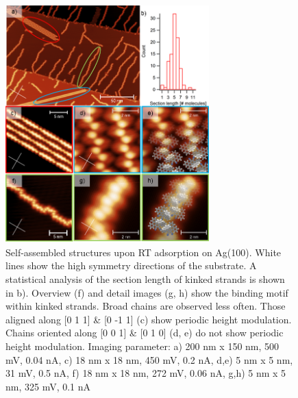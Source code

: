 \begin{figure} \centering
	\includegraphics[width=0.7\textwidth]{./images/paper/helicene/fig3}
	\caption{Self-assembled structures upon RT adsorption on Ag(100). White lines show the high symmetry directions of the substrate. A statistical analysis of the section length of kinked strands is shown in b). Overview (f) and detail images (g, h) show the binding motif within kinked strands. Broad chains are observed less often. Those aligned along [0 1 1] \& [0 -1 1] (c) show periodic height modulation. Chains oriented along [0 0 1] \& [0 1 0] (d, e) do not show periodic height modulation. Imaging parameter: a) 200 nm x 150 nm, 500 mV, 0.04 nA, c) 18 nm x 18 nm, 450 mV, 0.2 nA, d,e) 5 nm x 5 nm, 31 mV, 0.5 nA, f) 18 nm x 18 nm, 272 mV, 0.06 nA, g,h) 5 nm x 5 nm, 325 mV, 0.1 nA}
	\label{fig:hel-fig3}
\end{figure}

